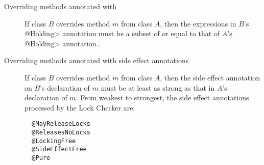 \begin{description}

\item[Overriding methods annotated with ]
  If class $B$ overrides method $m$ from class $A$, then the expressions in
  $B$'s \<@Holding>
  annotation must be a subset of or equal to that of $A$'s \<@Holding>
  annotation..

\item[Overriding methods annotated with side effect annotations]
  If class $B$ overrides method $m$ from class $A$, then
  the side effect annotation on $B$'s declaration of $m$
  must be at least as strong as that in $A$'s declaration of $m$.
  From weakest to strongest, the side effect annotations
  processed by the Lock Checker are:
\begin{verbatim}
  @MayReleaseLocks
  @ReleasesNoLocks
  @LockingFree
  @SideEffectFree
  @Pure
\end{verbatim}

\end{description}



